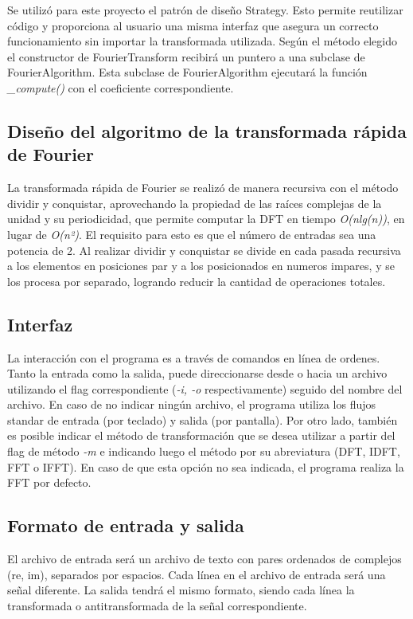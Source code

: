 \documentclass[12pt,a4paper]{report}
\begin{document}
			\indent Se utilizó para este proyecto el patrón de diseño Strategy. Esto permite reutilizar código y proporciona
			al usuario una misma interfaz que asegura un correcto funcionamiento sin importar la transformada utilizada. Según
			el método elegido el constructor de FourierTransform recibirá un puntero a una subclase de FourierAlgorithm. Esta subclase de FourierAlgorithm ejecutará la función \textit{\_compute()} con el coeficiente correspondiente.

		\subsection{Diseño del algoritmo de la transformada rápida de Fourier}
			\indent La transformada rápida de Fourier se realizó de manera recursiva con el método dividir y conquistar, aprovechando 
			la propiedad de las raíces complejas de la unidad y su periodicidad, que permite computar la DFT en tiempo \textit{O(nlg(n))},
			en lugar de \textit{O(n²)}. El requisito para esto es que el número de entradas sea una potencia de 2. Al realizar dividir
			y conquistar se divide en cada pasada recursiva a los elementos en posiciones par y a los posicionados en numeros impares, 
			y se los procesa por separado, logrando reducir la cantidad de operaciones totales.   


		\subsection{Interfaz}

			\indent La interacción con el programa es a través de comandos en línea de ordenes. Tanto la entrada 
			como la salida, puede direccionarse desde o hacia un archivo utilizando el flag correspondiente (\textit{-i, -o}
			respectivamente) seguido del nombre del archivo. En caso de no indicar ningún archivo, el programa utiliza los 
			flujos standar de entrada (por teclado) y salida (por pantalla). Por otro lado, también es posible indicar el método 
			de transformación que se desea utilizar a partir del flag de método \textit{-m} e indicando luego el método por su
			abreviatura (DFT, IDFT, FFT o IFFT). En caso de que esta opción no sea indicada, el programa realiza la FFT por defecto.

		\subsection{Formato de entrada y salida}

			\indent El archivo de entrada será un archivo de texto con pares ordenados de complejos (re, im), separados por
			espacios. Cada línea en el archivo de entrada será una señal diferente. La salida tendrá el mismo formato, siendo 
			cada línea la transformada o antitransformada de la señal correspondiente. 
\end{document}
